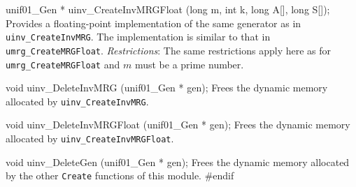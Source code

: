 unif01_Gen * uinv_CreateInvMRGFloat (long m, int k, long A[], long S[]);
\endcode
  \tab  Provides a floating-point implementation of the same generator
   as in {\tt uinv\_CreateInvMRG}.
   The implementation is similar to that in {\tt umrg\_CreateMRGFloat}.
   \emph{Restrictions}: The same restrictions apply here as for
   {\tt umrg\_CreateMRGFloat} and $m$ must be a prime number.
  \endtab


\code

void uinv_DeleteInvMRG (unif01_Gen * gen);
\endcode
  \tab Frees the dynamic memory allocated by
   {\tt uinv\_CreateInvMRG}.
 \endtab
\code


void uinv_DeleteInvMRGFloat (unif01_Gen * gen);
\endcode
  \tab Frees the dynamic memory allocated by
   {\tt uinv\_CreateInvMRGFloat}.
 \endtab
\code


void uinv_DeleteGen (unif01_Gen * gen);
\endcode
  \tab Frees the dynamic memory allocated by the other {\tt Create}
  functions of this module.
 \endtab
\code
\hide
#endif
\endhide
\endcode
